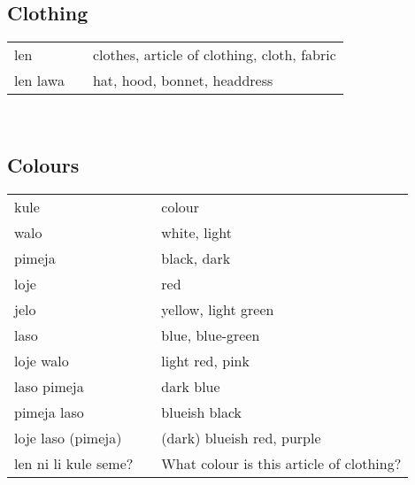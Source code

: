 \subsection{Clothing}
%
\begin{supertabular}{p{4,5cm}|ll}
len && clothes, article of clothing, cloth, fabric \\
len lawa && hat, hood, bonnet, headdress \\
\end{supertabular} \\
%
%
\subsection{Colours}
%
\begin{supertabular}{p{4,5cm}|ll}
kule && colour \\
walo && white, light \\
pimeja && black, dark \\
loje && red \\
jelo && yellow, light green \\
laso && blue, blue-green \\
loje walo && light red, pink \\
laso pimeja && dark blue \\
pimeja laso && blueish black \\
loje laso (pimeja) && (dark) blueish red, purple \\
len ni li kule seme? && What colour is this article of clothing? \\
\end{supertabular} \\
%
%
%
%
%
